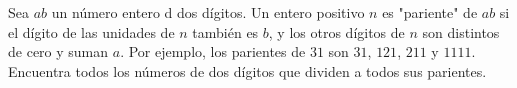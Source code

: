 Sea $ab$ un número entero d dos dígitos. Un entero positivo $n$ es "pariente" de $ab$ si el dígito de las unidades de $n$ también es $b$, y los otros dígitos de $n$ son distintos de cero y suman $a$. Por ejemplo, los parientes de $31$ son $31$, $121$, $211$ y $1111$. Encuentra todos los números de dos dígitos que dividen a todos sus parientes.